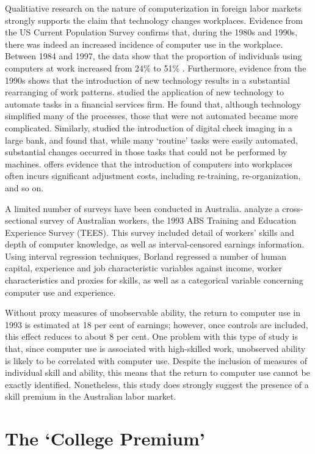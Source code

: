 Qualitiative research on the nature of computerization in foreign labor markets strongly supports the claim that technology changes workplaces. Evidence from the US Current Population Survey confirms that, during the 1980s and 1990s, there was indeed an increased incidence of computer use in the workplace. Between 1984 and 1997, the data show that the proportion of individuals using computers at work increased from 24\% to 51\% \citep{Friedberg2003}. Furthermore, evidence from the 1990s shows that the introduction of new technology results in a substantial rearranging of work patterns. \citet{Levy1996} studied the application of new technology to automate tasks in a financial services firm. He found that, although technology simplified many of the processes, those that were not automated became more complicated. Similarly, \citet{Autor2002} studied the introduction of digital check imaging in a large bank, and found that, while many `routine' tasks were easily automated, substantial changes occurred in those tasks that could not be performed by machines. \citet{Bresnahan2002} offers evidence that the introduction of computers into workplaces often incurs significant adjustment costs, including re-training, re-organization, and so on.

A limited number of surveys have been conducted in Australia. \citet{Borland2004} analyze a cross-sectional survey of Australian workers, the 1993 ABS Training and Education Experience Survey (TEES). This survey included detail of workers' skills and depth of computer knowledge, as well as interval-censored earnings information. Using interval regression techniques, Borland regressed a number of human capital, experience and job characteristic variables against income, worker characteristics and proxies for skills, as well as a categorical variable concerning computer use and experience. 

Without proxy measures of unobservable ability, the return to computer use in 1993 is estimated at 18 per cent of earnings; however, once controls are included, this effect reduces to about 8 per cent. One problem with this type of study is that, since computer use is associated with high-skilled work, unobserved ability is likely to be correlated with computer use. Despite the inclusion of measures of individual skill and ability, this means that the return to computer use cannot be exactly identified. Nonetheless, this study does strongly suggest the presence of a skill premium in the Australian labor market.

\section{The `College Premium'}


